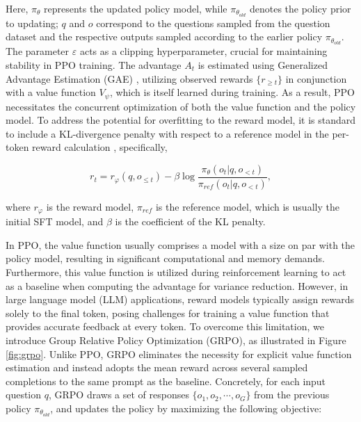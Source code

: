 \begin{itemize}[topsep=0pt]
\begin{itemize}[topsep=0pt]
Here, $\pi_{\theta}$ represents the updated policy model, while $\pi_{\theta_{old}}$ denotes the policy prior to updating; $q$ and $o$ correspond to the questions sampled from the question dataset and the respective outputs sampled according to the earlier policy $\pi_{\theta_{old}}$. The parameter $\varepsilon$ acts as a clipping hyperparameter, crucial for maintaining stability in PPO training. The advantage $A_t$ is estimated using Generalized Advantage Estimation (GAE) \citep{gae}, utilizing observed rewards $\{r_{\ge t}\}$ in conjunction with a value function $V_{\psi}$, which is itself learned during training. As a result, PPO necessitates the concurrent optimization of both the value function and the policy model. To address the potential for overfitting to the reward model, it is standard to include a KL-divergence penalty with respect to a reference model in the per-token reward calculation \citep{ouyang2022training}, specifically,

\begin{equation}
    r_{t} = r_\varphi(q, o_{\le t}) - \beta \log\frac{\pi_{\theta}(o_{t}|q, o_{<t})}{\pi_{ref}(o_{t}|q, o_{<t})},
\label{eq:PPO-reward}
\end{equation}

where $r_\varphi$  is the reward model, $\pi_{ref}$ is the reference model, which is usually the initial SFT model, and $\beta$  is the coefficient of the KL penalty.

In PPO, the value function usually comprises a model with a size on par with the policy model, resulting in significant computational and memory demands. Furthermore, this value function is utilized during reinforcement learning to act as a baseline when computing the advantage for variance reduction. However, in large language model (LLM) applications, reward models typically assign rewards solely to the final token, posing challenges for training a value function that provides accurate feedback at every token. To overcome this limitation, we introduce Group Relative Policy Optimization (GRPO), as illustrated in Figure \ref{fig:grpo}. Unlike PPO, GRPO eliminates the necessity for explicit value function estimation and instead adopts the mean reward across several sampled completions to the same prompt as the baseline. Concretely, for each input question $q$, GRPO draws a set of responses $\{o_1, o_2, \cdots, o_G\}$ from the previous policy $\pi_{\theta_{old}}$, and updates the policy by maximizing the following objective:


\end{itemize}
\end{itemize}
